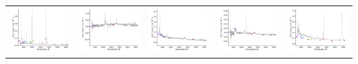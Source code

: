 \begin{center}
\begin{longtable}{l l l l l }
    \includegraphics[width=0.2\linewidth, clip]{Figs/Figs-sdss/spec-9150-58043-0660-STRIPE82-0143-028004.pdf} & \includegraphics[width=0.2\linewidth, clip]{Figs/Figs-sdss/spec-9151-58067-0073-STRIPE82-0147-026690.pdf} & \includegraphics[width=0.2\linewidth, clip]{Figs/Figs-sdss/spec-9152-58041-0463-STRIPE82-0147-005730.pdf} & \includegraphics[width=0.2\linewidth, clip]{Figs/Figs-sdss/spec-9163-58043-0013-STRIPE82-0122-036068.pdf} & \includegraphics[width=0.2\linewidth, clip]{Figs/Figs-sdss/spec-9163-58043-0152-STRIPE82-0122-053411.pdf} \\

\end{longtable}
\end{center}
